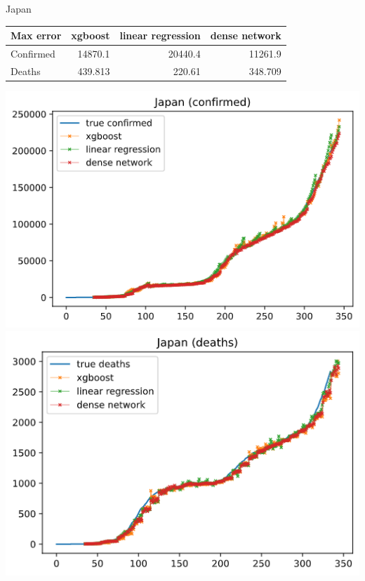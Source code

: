 \documentclass[a4paper,12pt]{article}
\begin{document}
\begin{tcolorbox}
    Japan

    \begin{tabular}{lrrr}
    \toprule
     Max error   &   xgboost &   linear regression &   dense network \\
    \midrule
     Confirmed   & 14870.1   &            20440.4  &       11261.9   \\
     Deaths      &   439.813 &              220.61 &         348.709 \\
    \bottomrule
    \end{tabular}

    \begin{center}
        \includegraphics[width=\textwidth]{Japan_5-1.png}
        \includegraphics[width=\textwidth]{Japan_5-2.png}
    \end{center}
\end{tcolorbox}
\end{document}
